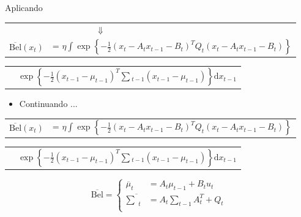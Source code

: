 Aplicando 

\begin{tabular}{p{1.2cm} l}
    & $\quad\quad\quad\quad\quad \Downarrow$\\
    $\overline{\text{Bel}}(x_t)$  & = $\eta \displaystyle\int \exp\left\{  -\frac{1}{2} \left(x_t - A_t x_{t-1} - B_t\right)^T Q_t \left(x_t - A_t x_{t-1} - B_t\right)  \right\}$ \\
\end{tabular}

\begin{tabular}{p{2.3cm} l}
    & $\exp\left\{ -\displaystyle\frac{1}{2} \left(x_{t-1} - \mu_{t-1}\right)^T \textstyle\sum {}_{t-1} \left(x_{t-1} - \mu_{t-1}\right)  \right\}\text{d}x_{t-1}$
\end{tabular}    



\begin{itemize}
    \item Continuando ...
\end{itemize}

\begin{tabular}{p{1.2cm} l}      
    $\overline{\text{Bel}}(x_t)$  & = $\eta \displaystyle\int \exp\left\{  -\frac{1}{2} \left(x_t - A_t x_{t-1} - B_t\right)^T Q_t \left(x_t - A_t x_{t-1} - B_t\right)  \right\}$ \\
\end{tabular}
    
\begin{tabular}{p{2.3cm} l}
    & $\exp\left\{ -\displaystyle\frac{1}{2} \left(x_{t-1} - \mu_{t-1}\right)^T \textstyle\sum {}_{t-1} \left(x_{t-1} - \mu_{t-1}\right)  \right\}\text{d}x_{t-1}$
\end{tabular}    


\begin{equation}
    \overline{\text{Bel}} = 
    \left\{
    \begin{aligned}
            \overline{\mu}_t & = A_t\mu_{t-1} + B_t u_t\\
            \overline{\textstyle\sum}_t & = A_t {\textstyle\sum}_{t-1} A_t^T+ Q_t\\
    \end{aligned} \right.
\end{equation}



